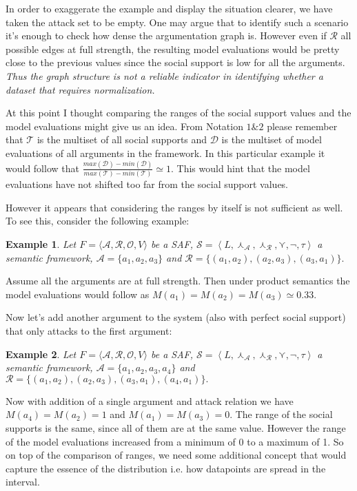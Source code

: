 \documentclass{article}
\newtheorem{example}{Example}
\newcommand{\args}{\mathcal{A}} %
\newcommand{\att}{\mathcal{R}}  %
\newcommand{\valueset}{L}
\newcommand{\obj}{\mathcal{O}} %
\newcommand{\safid}{F}               %
\newcommand{\safbodyO}{\langle \args, \att, \obj, V \rangle} %
\newcommand{\safO}{\safid = \safbodyO} %
\newcommand{\sembodyNew}{\left\langle \valueset,\SAFand_\mathcal{A}, \SAFand_\mathcal{R},\SAFor,\lnot,\tau \right\rangle} %
\newcommand{\SAFand}{\curlywedge}     %
\newcommand{\SAFor}{\curlyvee}        %
\newcommand{\sem}{\mathcal{S}}
\newcommand{\dataset}{\mathcal{D}}   %
\newcommand{\ssset}{\mathcal{T}}   %
\begin{document}
In order to exaggerate the example and display the situation clearer, we have taken the attack set to be empty. One may argue that to identify such a scenario it's enough to check how dense the argumentation graph is. However even if $\att$ all possible edges at full strength, the resulting model evaluations would be pretty close to the previous values since the social support is low for all the arguments. \emph{Thus the graph structure is not a reliable indicator in identifying whether a dataset that requires normalization.}

At this point I thought comparing the ranges of the social support values and the model evaluations might give us an idea. From Notation $1\&2$ please remember that $\ssset$ is the multiset of all social supports and $\dataset$  is the multiset of model evaluations of all arguments in the framework. In this particular example it would follow that  $\frac{max(\dataset) - min(\dataset)}{max(\ssset) - min(\ssset)} \simeq 1$. This would hint that the model evaluations have not shifted too far from the social support values. 

\vspace{3mm}
However it appears that considering the ranges by itself is not sufficient as well. To see this, consider the following example:

\begin{example}
Let $\safO$ be a SAF, $\sem = \sembodyNew$ a semantic framework, $\args =\{a_1, a_2, a_3\}$ and $\att = \{(a_1,a_2), (a_2,a_3), (a_3,a_1)\}.$
\end{example}

Assume all the arguments are at full strength. Then under product semantics the model evaluations would follow as $M(a_1) = M(a_2) = M(a_3) \simeq 0.33$.

Now let's add another argument to the system (also with perfect social support) that only attacks to the first argument:

\begin{example}
Let $\safO$ be a SAF, $\sem = \sembodyNew$ a semantic framework, $\args =\{a_1, a_2, a_3, a_4\}$ and $\att = \{(a_1,a_2), (a_2,a_3), (a_3,a_1), (a_4,a_1)\}.$
\end{example}

Now with addition of a single argument and attack relation we have $M(a_4) = M(a_2) =  1$ and $M(a_1) = M(a_3) =  0$. The range of the social supports is the same, since all of them are at the same value. However the range of the model evaluations increased from a minimum of 0 to a maximum of 1. So on top of the comparison of ranges, we need some additional concept that would capture the essence of the distribution i.e. how datapoints are spread in the interval.
\end{document}
